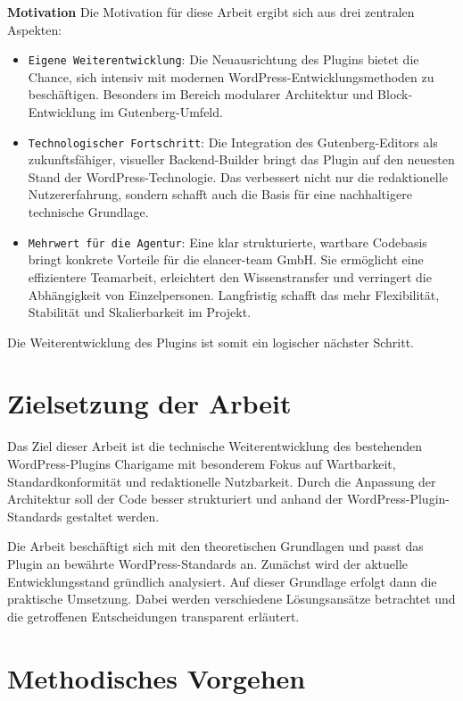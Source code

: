\textbf{Motivation}
Die Motivation für diese Arbeit ergibt sich aus drei zentralen Aspekten:
\begin{itemize}
    \item \texttt{Eigene Weiterentwicklung}: Die Neuausrichtung des Plugins bietet die Chance, sich intensiv mit modernen WordPress-Entwicklungsmethoden zu beschäftigen. Besonders im Bereich modularer Architektur und Block-Entwicklung im Gutenberg-Umfeld.

    \item \texttt{Technologischer Fortschritt}: Die Integration des Gutenberg-Editors als zukunftsfähiger, visueller Backend-Builder bringt das Plugin auf den neuesten Stand der WordPress-Technologie. Das verbessert nicht nur die redaktionelle Nutzererfahrung, sondern schafft auch die Basis für eine nachhaltigere technische Grundlage.

    \item \texttt{Mehrwert für die Agentur}: Eine klar strukturierte, wartbare Codebasis bringt konkrete Vorteile für die elancer-team GmbH. Sie ermöglicht eine effizientere Teamarbeit, erleichtert den Wissenstransfer und verringert die Abhängigkeit von Einzelpersonen. Langfristig schafft das mehr Flexibilität, Stabilität und Skalierbarkeit im Projekt.
\end{itemize}
Die Weiterentwicklung des Plugins ist somit ein logischer nächster Schritt.


\section{Zielsetzung der Arbeit}

Das Ziel dieser Arbeit ist die technische Weiterentwicklung des bestehenden WordPress-Plugins Charigame mit besonderem Fokus auf Wartbarkeit, Standardkonformität und redaktionelle Nutzbarkeit.
Durch die Anpassung der Architektur soll der Code besser strukturiert und anhand der WordPress-Plugin-Standards gestaltet werden.

Die Arbeit beschäftigt sich mit den theoretischen Grundlagen und passt das Plugin an bewährte WordPress-Standards an.
Zunächst wird der aktuelle Entwicklungsstand gründlich analysiert.
Auf dieser Grundlage erfolgt dann die praktische Umsetzung.
Dabei werden verschiedene Lösungsansätze betrachtet und die getroffenen Entscheidungen transparent erläutert.

\section{Methodisches Vorgehen}

